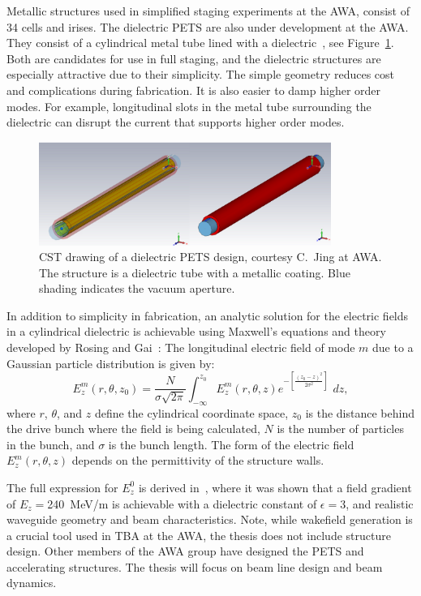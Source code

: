 Metallic structures used in simplified staging experiments at the AWA, consist of 34 cells and irises. 
The dielectric PETS are also under development at the AWA. 
They consist of a cylindrical metal tube lined with a dielectric~\cite{PETSeq}, 
see Figure~\ref{fig:PETS}. Both are candidates for use in full staging, and 
the dielectric structures are especially attractive due to their simplicity. 
The simple geometry reduces cost and complications during fabrication.
It is also easier to damp higher order modes. For example, longitudinal slots in the metal tube surrounding
the dielectric can disrupt the current that supports higher order modes.   
\begin{figure}
	\begin{center}
		\includegraphics[width=0.85\textwidth]{images/pets-cst.png}
		\caption{CST drawing of a dielectric PETS design, courtesy C.~Jing at AWA. 
		The structure is a dielectric tube with a metallic coating. Blue shading 
	indicates the vacuum aperture.}
		\label{fig:PETS}
	\end{center}
\end{figure}
In addition to simplicity in fabrication, an analytic solution for the electric fields
in a cylindrical dielectric is achievable using Maxwell's equations and theory developed
by Rosing and Gai~\cite{RosingWei}: The longitudinal electric field of mode $m$ 
due to a Gaussian particle distribution is given by:
\begin{equation}
E^m_z\left(r,\theta,z_0\right)= \frac{N}{\sigma \sqrt{2\pi}}\int_{-\infty}^{z_0}E^m_z\left(r,\theta,z\right)e^{-\left[\frac{\left(z_0-z\right)^2}{2\sigma^2}\right]}\,\,dz , 
\end{equation}
where $r$, $\theta$, and $z$ define the cylindrical coordinate space, 
$z_0$ is the distance behind the drive bunch where the field is being calculated, 
$N$ is the number of particles in the bunch, and $\sigma$ is the bunch length.
The form of the electric field $E^m_z\left(r,\theta,z\right)$ depends on the 
permittivity of the structure walls.

The full expression for $E_z^0$ is derived in~\cite{RosingWei}, 
where it was shown that a field gradient of $E_{z}=$\SI{240}{MeV/m} 
is achievable with a dielectric constant of $\epsilon=3$, and realistic waveguide geometry and beam characteristics.
Note, while wakefield generation is a crucial tool used in TBA at the AWA, the thesis does not include 
structure design. Other members of the AWA group have designed the PETS and accelerating
structures. The thesis will focus on beam line design and beam dynamics. 

